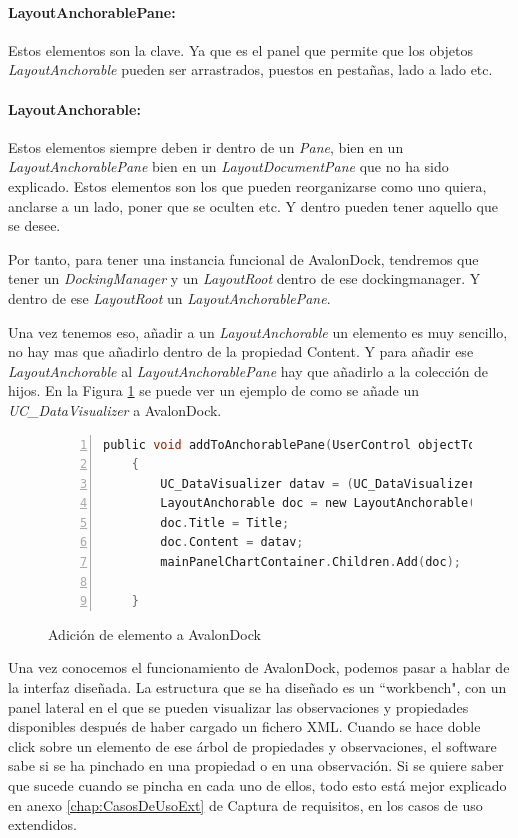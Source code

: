 \paragraph{LayoutAnchorablePane:} Estos elementos son la clave. Ya que es el panel que permite que los objetos
\emph{LayoutAnchorable} pueden ser arrastrados, puestos en pesta\~nas, lado a lado etc.

\paragraph{LayoutAnchorable:} Estos elementos siempre deben ir dentro de un \emph{Pane}, bien en un \emph{LayoutAnchorablePane}
bien en un \emph{LayoutDocumentPane} que no ha sido explicado. Estos elementos son los que pueden reorganizarse como uno quiera,
anclarse a un lado, poner que se oculten etc. Y dentro pueden tener aquello que se desee.

Por tanto, para tener una instancia funcional de AvalonDock, tendremos que tener un \emph{DockingManager} y un
\emph{LayoutRoot} dentro de ese dockingmanager. Y dentro de ese \emph{LayoutRoot} un \emph{LayoutAnchorablePane}.

Una vez tenemos eso, a\~nadir a un \emph{LayoutAnchorable} un elemento es muy sencillo, no hay mas que a\~nadirlo dentro de la
propiedad Content. Y para a\~nadir ese \emph{LayoutAnchorable} al \emph{LayoutAnchorablePane} hay que a\~nadirlo a la colecci\'on
de hijos. En la Figura \ref{AnadirHijoAvalonDock} se puede ver un ejemplo de como se a\~nade un \emph{UC\_DataVisualizer} a 
AvalonDock.

\begin{figure}[h]
    \begin{lstlisting}[tabsize=2, language=C, numbers=left, showspaces=false, breaklines=true]
    public void addToAnchorablePane(UserControl objectToAdd, string Title)
    {
        UC_DataVisualizer datav = (UC_DataVisualizer)objectToAdd;
        LayoutAnchorable doc = new LayoutAnchorable();
        doc.Title = Title;
        doc.Content = datav;
        mainPanelChartContainer.Children.Add(doc);

    }
    \end{lstlisting}
    \caption[Adici\'on de elemento a AvalonDock]{Adici\'on de elemento a AvalonDock}
    \label{AnadirHijoAvalonDock}
\end{figure}

Una vez conocemos el funcionamiento de AvalonDock, podemos pasar a hablar de la interfaz dise\~nada.
La estructura que se ha dise\~nado es un ``workbench", con un panel lateral en el que se pueden visualizar las observaciones
y propiedades disponibles despu\'es de haber cargado un fichero XML. Cuando se hace doble click sobre un elemento
de ese \'arbol de propiedades y observaciones, el software sabe si se ha pinchado en una propiedad o en una observaci\'on.
Si se quiere saber que sucede cuando se pincha en cada uno de ellos, todo esto est\'a mejor explicado en anexo 
\ref{chap:CasosDeUsoExt} de
Captura de requisitos, en los casos de uso extendidos.

